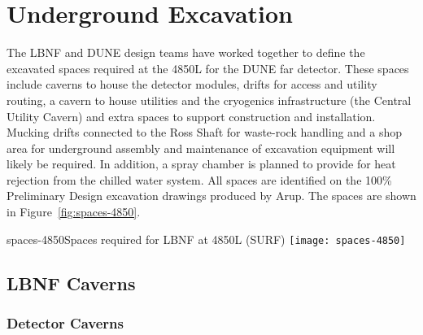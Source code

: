 \chapter{Underground Excavation}
\label{ch:fscf-excav}

The LBNF and DUNE design teams have worked together to define the excavated spaces required at the 4850L for the DUNE far detector. 
%
These spaces include caverns to house the detector modules, drifts for access and utility routing, a cavern to house utilities and the cryogenics infrastructure (the Central Utility Cavern) and extra spaces to support construction and installation. %
Mucking drifts connected to the Ross Shaft %
for waste-rock handling and %
a shop area for underground assembly and maintenance of excavation equipment will likely be required. In addition, a spray chamber is %
planned to provide for heat rejection from the chilled water system. All spaces are identified on the 100\% Preliminary Design excavation drawings produced by Arup\cite{arup:fscf100pdr}. The spaces are shown in Figure~\ref{fig:spaces-4850}.

\begin{cdrfigure}{spaces-4850}{Spaces required for LBNF at 4850L (SURF)}
\texttt{[image: spaces-4850]}
\end{cdrfigure}

\section{LBNF Caverns} %
\label{sec:fscf-excav-cav}

\subsection{Detector Caverns} %
\label{sec:fscf-excav-det}


